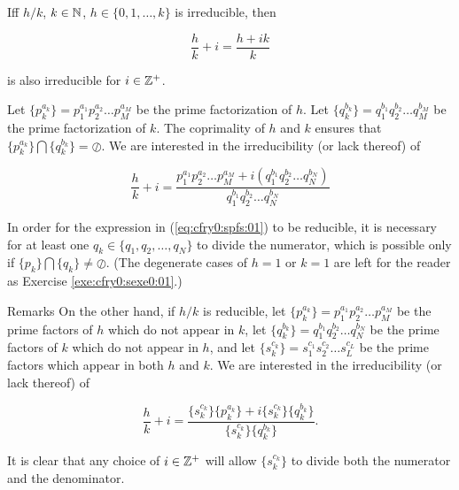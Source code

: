 \begin{vworktheoremstatement}
\label{thm:cfry0:spfs:01}
Iff $h/k$, $k \in {\mathbb{N}}$, $h \in \{0, 1, \ldots{}, k\}$
is irreducible, then

\begin{equation}
\frac{h}{k} + i = \frac{h + ik}{k}
\end{equation}

is also irreducible for $i \in {\mathbb{Z}^+}$.
\end{vworktheoremstatement}
\begin{vworktheoremproof}
Let $\{p_k^{a_k}\} = p_1^{a_1} p_2^{a_2} \ldots{} p_M^{a_M}$ be the prime
factorization of $h$.
Let $\{q_k^{b_k}\} = q_1^{b_1} q_2^{b_2} \ldots{} q_M^{b_M}$ be the prime
factorization of $k$.  The coprimality of $h$ and $k$ ensures that
$\{p_k^{a_k}\} \bigcap \{q_k^{b_k}\} = \oslash$.  We are interested in the
irreducibility (or lack thereof) of

\begin{equation}
\label{eq:cfry0:spfs:01}
\frac{h}{k} + i =
\frac{p_1^{a_1} p_2^{a_2} \ldots{} p_M^{a_M} +
i(q_1^{b_1} q_2^{b_2} \ldots{} q_N^{b_N})}
{q_1^{b_1}  q_2^{b_2} \ldots{} q_N^{b_N}}
\end{equation}

In order for the expression in (\ref{eq:cfry0:spfs:01}) to be reducible,
it is necessary for at least one $q_k \in \{q_1, q_2, \ldots{}, q_N\}$
to divide the numerator, which is possible only if
$\{p_k\} \bigcap \{q_k\} \neq \oslash$.  (The degenerate cases
of $h=1$ or $k=1$ are left for the reader as
Exercise \ref{exe:cfry0:sexe0:01}.)
\end{vworktheoremproof}
\begin{vworktheoremparsection}{Remarks}
On the other hand, if $h/k$ is reducible, let
$\{p_k^{a_k}\} = p_1^{a_1} p_2^{a_2} \ldots{} p_M^{a_M}$
be the prime factors of $h$ which do not appear in $k$, let
$\{q_k^{b_k}\} = q_1^{b_1} q_2^{b_2} \ldots{} q_N^{b_N}$
be the prime factors of $k$ which do not appear in $h$,
and let
$\{s_k^{c_k}\} = s_1^{c_1} s_2^{c_2} \ldots{} s_L^{c_L}$
be the prime factors which appear in both $h$ and $k$.
We are interested in the irreducibility (or lack thereof)
of

\begin{equation}
\label{eq:cfry0:spfs:02}
\frac{h}{k} + i =
\frac{ \{ s_k^{c_k} \} \{ p_k^{a_k} \} + i \{ s_k^{c_k} \} \{ q_k^{b_k} \} }
{ \{ s_k^{c_k} \} \{ q_k^{b_k} \} }.
\end{equation}

It is clear that any choice of 
$i \in {\mathbb{Z}^+}$ will allow $\{s_k^{c_k}\}$
to divide both the numerator and the denominator.
\end{vworktheoremparsection}
\vworktheoremfooter{}

